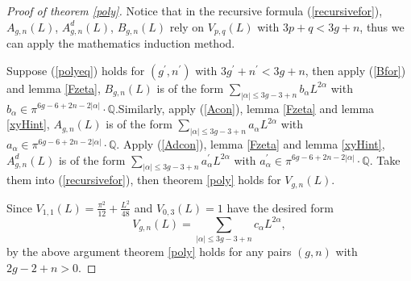 \begin{proof}[Proof of theorem \ref{poly}]
Notice that in the recursive  formula (\ref{recursivefor}), 
$A_{g,n}(L)$, $A_{g,n}^d(L)$, $B_{g,n}(L)$ rely on   $V_{p,q}(L)$ with $3p+q<3g+n$, thus we can apply the mathematics induction method. 

Suppose (\ref{polyeq}) holds for $(g^\prime,n^\prime)$ with $3g^\prime+n^\prime<3g+n$,  then apply (\ref{Bfor}) and lemma \ref{Fzeta}, $B_{g,n}(L)$ is of the form $\sum_{|\alpha|\leq 3g-3+n}b_\alpha L^{2\alpha}$ with $b_\alpha\in \pi^{6g-6+2n-2|\alpha|}\cdot \mathbb{Q}$.Similarly,  apply (\ref{Acon}), lemma \ref{Fzeta} and lemma \ref{xyHint}, $A_{g,n}(L)$ is of the form $\sum_{|\alpha|\leq 3g-3+n}a_\alpha L^{2\alpha}$ with $a_\alpha\in \pi^{6g-6+2n-2|\alpha|}\cdot \mathbb{Q}$. Apply (\ref{Adcon}), lemma \ref{Fzeta} and lemma \ref{xyHint}, $A_{g,n}^d(L)$ is of the form $\sum_{|\alpha|\leq 3g-3+n}a_\alpha^\prime L^{2\alpha}$ with $a_\alpha^\prime\in \pi^{6g-6+2n-2|\alpha|}\cdot \mathbb{Q}$.
Take them into (\ref{recursivefor}), then theorem \ref{poly} holds for $V_{g,n}(L)$.

Since $V_{1,1}(L)=\frac{\pi^2}{12}+\frac{L^2}{48}$ and $V_{0,3}(L)=1$ have  the desired form $$
V_{g,n}(L)=\sum\limits_{|\alpha|\leq 3g-3+n}c_\alpha L^{2\alpha},
$$
 by the above argument theorem \ref{poly} holds for any pairs $(g,n)$ with $2g-2+n>0$.
\end{proof}